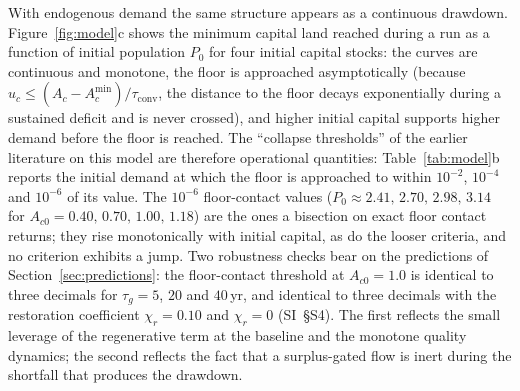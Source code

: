 \documentclass[preprint,12pt,authoryear]{elsarticle}
\newcommand{\Acmin}{A_c^{\min}}
\newcommand{\tconv}{\tau_{\mathrm{conv}}}
\begin{document}
With endogenous demand the same structure appears as a continuous drawdown. Figure~\ref{fig:model}c shows the minimum capital land reached during a run as a function of initial population $P_0$ for four initial capital stocks: the curves are continuous and monotone, the floor is approached asymptotically (because $u_c\le(A_c-\Acmin)/\tconv$, the distance to the floor decays exponentially during a sustained deficit and is never crossed), and higher initial capital supports higher demand before the floor is reached. The ``collapse thresholds'' of the earlier literature on this model are therefore operational quantities: Table~\ref{tab:model}b reports the initial demand at which the floor is approached to within $10^{-2}$, $10^{-4}$ and $10^{-6}$ of its value. The $10^{-6}$ floor-contact values ($P_0\approx2.41,\,2.70,\,2.98,\,3.14$ for $A_{c0}=0.40,\,0.70,\,1.00,\,1.18$) are the ones a bisection on exact floor contact returns; they rise monotonically with initial capital, as do the looser criteria, and no criterion exhibits a jump. Two robustness checks bear on the predictions of Section~\ref{sec:predictions}: the floor-contact threshold at $A_{c0}=1.0$ is identical to three decimals for $\tau_g=5$, $20$ and $40$\,yr, and identical to three decimals with the restoration coefficient $\chi_r=0.10$ and $\chi_r=0$ (SI~\S S4). The first reflects the small leverage of the regenerative term at the baseline and the monotone quality dynamics; the second reflects the fact that a surplus-gated flow is inert during the shortfall that produces the drawdown.
\end{document}
